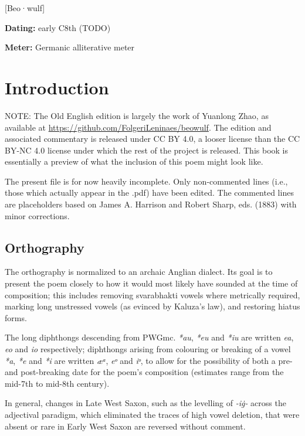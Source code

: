 [Beo·wulf]

\begin{flushright}%
\textbf{Dating:} early C8th (TODO)

\textbf{Meter:} Germanic alliterative meter
\end{flushright}%

\section{Introduction}

NOTE: The Old English edition is largely the work of Yuanlong Zhao, as available at \url{https://github.com/FolgeriLeninaes/beowulf}.  The edition and associated commentary is released under CC BY 4.0, a looser license than the CC BY-NC 4.0 license under which the rest of the project is released.  This book is essentially a preview of what the inclusion of this poem might look like.

The present file is for now heavily incomplete.  Only non-commented lines (i.e., those which actually appear in the .pdf) have been edited.  The commented lines are placeholders based on James A. Harrison and Robert Sharp, eds. (1883) with minor corrections.

\subsection{Orthography}

The orthography is normalized to an archaic Anglian dialect. Its goal is to present the poem closely to how it would most likely have sounded at the time of composition; this includes removing svarabhakti vowels where metrically required, marking long unstressed vowels (as evinced by Kaluza's law), and restoring hiatus forms.

The long diphthongs descending from PWGmc. \emph{*au}, \emph{*eu} and \emph{*iu} are written \emph{ea}, \emph{eo} and \emph{io} respectively; diphthongs arising from colouring or breaking of a vowel \emph{*a}, \emph{*e} and \emph{*i} are written \emph{æᵃ}, \emph{eᵒ} and \emph{iᵒ}, to allow for the possibility of both a pre- and post-breaking date for the poem's composition (estimates range from the mid-7th to mid-8th century).

In general, changes in Late West Saxon, such as the levelling of \emph{-iġ-} across the adjectival paradigm, which eliminated the traces of high vowel deletion, that were absent or rare in Early West Saxon are reversed without comment.

